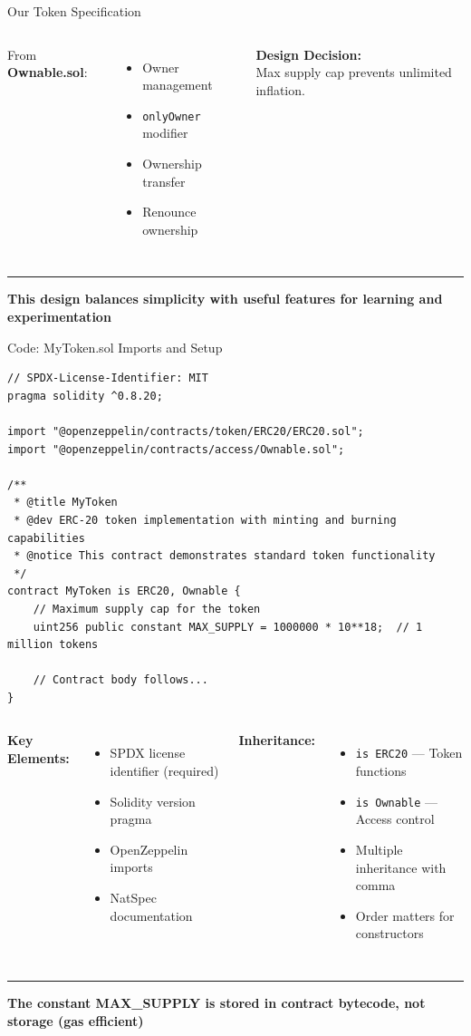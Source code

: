 \documentclass[8pt,aspectratio=169]{beamer}
\newcommand{\bottomnote}[1]{%
\vfill
\vspace{-2mm}
\textcolor{mllavender2}{\rule{\textwidth}{0.4pt}}
\vspace{1mm}
\footnotesize
\textbf{#1}
}
\begin{document}
\begin{frame}[t]{Our Token Specification}
\begin{columns}[T]
\vspace{0.3em}
From \textbf{Ownable.sol}:
\begin{itemize}
\item Owner management
\item \texttt{onlyOwner} modifier
\item Ownership transfer
\item Renounce ownership
\end{itemize}

\vspace{0.3em}
\textbf{Design Decision:}\\
Max supply cap prevents unlimited inflation.
\end{columns}

\bottomnote{This design balances simplicity with useful features for learning and experimentation}
\end{frame}

\begin{frame}[t,fragile]{Code: MyToken.sol Imports and Setup}
\begin{lstlisting}[style=solidity]
// SPDX-License-Identifier: MIT
pragma solidity ^0.8.20;

import "@openzeppelin/contracts/token/ERC20/ERC20.sol";
import "@openzeppelin/contracts/access/Ownable.sol";

/**
 * @title MyToken
 * @dev ERC-20 token implementation with minting and burning capabilities
 * @notice This contract demonstrates standard token functionality
 */
contract MyToken is ERC20, Ownable {
    // Maximum supply cap for the token
    uint256 public constant MAX_SUPPLY = 1000000 * 10**18;  // 1 million tokens

    // Contract body follows...
}
\end{lstlisting}

\vspace{0.3em}
\begin{columns}[T]
\textbf{Key Elements:}
\begin{itemize}
\item SPDX license identifier (required)
\item Solidity version pragma
\item OpenZeppelin imports
\item NatSpec documentation
\end{itemize}

\textbf{Inheritance:}
\begin{itemize}
\item \texttt{is ERC20} --- Token functions
\item \texttt{is Ownable} --- Access control
\item Multiple inheritance with comma
\item Order matters for constructors
\end{itemize}
\end{columns}

\bottomnote{The constant MAX\_SUPPLY is stored in contract bytecode, not storage (gas efficient)}
\end{frame}
\end{document}
